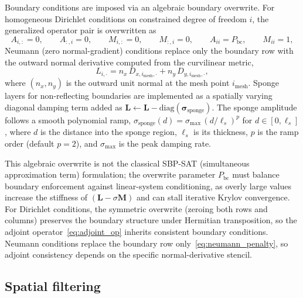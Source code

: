 \documentclass[11pt]{article}
\newcommand{\bL}{\mathbf{L}}
\newcommand{\bM}{\mathbf{M}}
\begin{document}
Boundary conditions are imposed via an algebraic boundary overwrite.
For homogeneous Dirichlet conditions on constrained degree of freedom $i$, the generalized operator pair is overwritten as
\begin{equation}
  A_{i,:}=0,\qquad A_{:,i}=0,\qquad
  M_{i,:}=0,\qquad M_{:,i}=0,\qquad
  A_{ii}=P_{\mathrm{bc}},\qquad M_{ii}=1,
  \label{eq:dirichlet_penalty}
\end{equation}
Neumann (zero normal-gradient) conditions replace only the boundary row with the outward normal derivative computed from the curvilinear metric,
\begin{equation}
  L_{i,\cdot} = n_x\,D_{x,i_\mathrm{mesh},\cdot} + n_y\,D_{y,i_\mathrm{mesh},\cdot},
  \label{eq:neumann_penalty}
\end{equation}
where $(n_x,n_y)$ is the outward unit normal at the mesh point $i_\mathrm{mesh}$.
Sponge layers for non-reflecting boundaries are implemented as a spatially varying diagonal damping term added as
$\bL \leftarrow \bL - \mathrm{diag}(\bm{\sigma}_{\mathrm{sponge}})$.
The sponge amplitude follows a smooth polynomial ramp, $\sigma_{\mathrm{sponge}}(d) = \sigma_{\max}\,(d/\ell_s)^p$ for $d \in [0, \ell_s]$, where $d$ is the distance into the sponge region, $\ell_s$ is its thickness, $p$ is the ramp order (default $p = 2$), and $\sigma_{\max}$ is the peak damping rate.

This algebraic overwrite is not the classical SBP-SAT (simultaneous approximation term) formulation; the overwrite parameter $P_{\mathrm{bc}}$ must balance boundary enforcement against linear-system conditioning, as overly large values increase the stiffness of $(\bL - \sigma\bM)$ and can stall iterative Krylov convergence.
For Dirichlet conditions, the symmetric overwrite (zeroing both rows and columns) preserves the boundary structure under Hermitian transposition, so the adjoint operator~\eqref{eq:adjoint_op} inherits consistent boundary conditions.
Neumann conditions replace the boundary row only~\eqref{eq:neumann_penalty}, so adjoint consistency depends on the specific normal-derivative stencil.

\subsection{Spatial filtering}
\label{sec:filtering}
\end{document}
